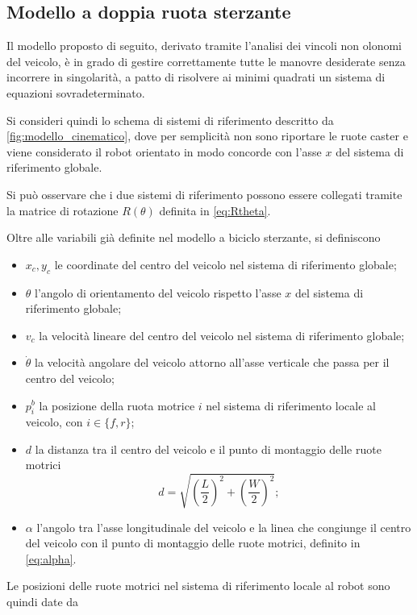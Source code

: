 \subsection{Modello a doppia ruota sterzante}
Il modello proposto di seguito, derivato tramite l'analisi dei vincoli non olonomi del veicolo, è in grado di gestire correttamente tutte le manovre desiderate senza incorrere in singolarità, a patto di risolvere ai minimi quadrati un sistema di equazioni sovradeterminato.

Si consideri quindi lo schema di sistemi di riferimento descritto da \cref{fig:modello_cinematico}, dove per semplicità non sono riportare le ruote caster e viene considerato il robot orientato in modo concorde con l'asse $x$ del sistema di riferimento globale.
\begin{note}
    Si può osservare che i due sistemi di riferimento possono essere collegati tramite la matrice di rotazione $R(\theta)$ definita in \cref{eq:Rtheta}.
\end{note}
Oltre alle variabili già definite nel modello a biciclo sterzante, si definiscono
\begin{itemize}
    \item $x_c, y_c$ le coordinate del centro del veicolo nel sistema di riferimento globale;
    \item $\theta$ l'angolo di orientamento del veicolo rispetto l'asse $x$ del sistema di riferimento globale;
    \item $v_c$ la velocità lineare del centro del veicolo nel sistema di riferimento globale;
    \item $\dot{\theta}$ la velocità angolare del veicolo attorno all'asse verticale che passa per il centro del veicolo;
    \item $p_i^b$ la posizione della ruota motrice $i$ nel sistema di riferimento locale al veicolo, con $i \in \{f,r\}$;
    \item $d$ la distanza tra il centro del veicolo e il punto di montaggio delle ruote motrici
          \begin{equation}\label{eq:wheeldist}
              d = \sqrt{\left(\frac{L}{2}\right)^2 + \left(\frac{W}{2}\right)^2};
          \end{equation}
    \item $\alpha$ l'angolo tra l'asse longitudinale del veicolo e la linea che congiunge il centro del veicolo con il punto di montaggio delle ruote motrici, definito in \cref{eq:alpha}.
\end{itemize}
Le posizioni delle ruote motrici nel sistema di riferimento locale al robot sono quindi date da
